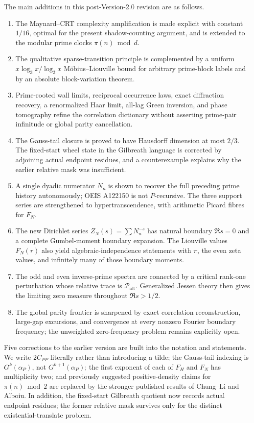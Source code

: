 \documentclass[11pt]{article}
\theoremstyle{definition}
\theoremstyle{remark}
\newcommand{\Palt}{\mathcal P_{\mathrm{alt}}}
\begin{document}
The main additions in this post-Version-2.0 revision are as follows.
\begin{enumerate}[label=\textup{(\roman*)}]
 \item The Maynard--CRT complexity amplification is made explicit with constant
 $1/16$, optimal for the present shadow-counting argument, and is extended to the
 modular prime clocks $\pi(n)\bmod d$.
 \item The qualitative sparse-transition principle is complemented by a uniform
 $x\log_3x/\log_2x$ M\"obius--Liouville bound for arbitrary prime-block labels and by
 an absolute block-variation theorem.
 \item Prime-rooted wall limits, reciprocal occurrence laws, exact diffraction recovery,
 a renormalized Haar limit, all-lag Green inversion, and phase tomography refine the
 correlation dictionary without asserting prime-pair infinitude or global parity
 cancellation.
 \item The Gauss-tail closure is proved to have Hausdorff dimension at most $2/3$.
 The fixed-start wheel state in the Gilbreath language is corrected by adjoining actual
 endpoint residues, and a counterexample explains why the earlier relative mask was
 insufficient.
 \item A single dyadic numerator $N_n$ is shown to recover the full preceding prime
 history autonomously; OEIS A122150 is not $P$-recursive.  The three support series are
 strengthened to hypertranscendence, with arithmetic Picard fibres for $F_N$.
 \item The new Dirichlet series $Z_N(s)=\sum N_n^{-s}$ has natural boundary
 $\Re s=0$ and a complete Gumbel-moment boundary expansion.  The Liouville values
 $F_N(r)$ also yield algebraic-independence statements with $\pi$, the even zeta values,
 and infinitely many of those boundary moments.
 \item The odd and even inverse-prime spectra are connected by a critical rank-one
 perturbation whose relative trace is $\Palt$.  Generalized Jessen theory then gives the
 limiting zero measure throughout $\Re s>1/2$.
 \item The global parity frontier is sharpened by exact correlation reconstruction,
 large-gap excursions, and convergence at every nonzero Fourier boundary frequency;
 the unweighted zero-frequency problem remains explicitly open.
\end{enumerate}

Five corrections to the earlier version are built into the notation and statements.  We
write $2C_{PP}$ literally rather than introducing a tilde; the Gauss-tail indexing is
$G^k(\alpha_P)$, not $G^{k+1}(\alpha_P)$; the first exponent of each of $F_H$ and $F_N$
has multiplicity two; and previously suggested positive-density claims for
$\pi(n)\bmod2$ are replaced by the stronger published results of Chung--Li and Alboiu.
In addition, the fixed-start Gilbreath quotient now records actual endpoint residues;
the former relative mask survives only for the distinct existential-translate problem.
\end{document}
